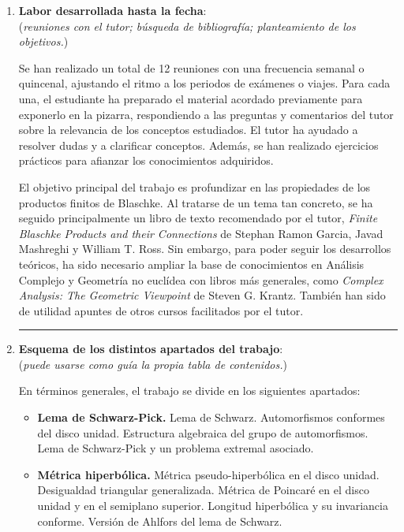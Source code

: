 \documentclass[a4paper,oneside,11pt,leqno]{article}
\begin{document}
\begin{enumerate}[label=\textbf{\arabic*.}]

\item {\bf Labor desarrollada hasta la fecha}: \\
{\small (\textit{reuniones con el tutor; b\'usqueda de bibliograf\'ia; planteamiento de los objetivos.})}

Se han realizado un total de 12 reuniones con una frecuencia semanal o quincenal, ajustando el ritmo a los periodos de ex\'amenes o viajes. Para cada una, el estudiante ha preparado el material acordado previamente para exponerlo en la pizarra, respondiendo a las preguntas y comentarios del tutor sobre la relevancia de los conceptos estudiados. El tutor ha ayudado a resolver dudas y a clarificar conceptos. Adem\'as, se han realizado ejercicios pr\'acticos para afianzar los conocimientos adquiridos.

El objetivo principal del trabajo es profundizar en las propiedades de los productos finitos de Blaschke. Al tratarse de un tema tan concreto, se ha seguido principalmente un libro de texto recomendado por el tutor, \cite{garciaFiniteBlaschkeProducts2018} \textit{Finite Blaschke Products and their Connections} de Stephan Ramon Garcia, Javad Mashreghi y William T. Ross. Sin embargo, para poder seguir los desarrollos te\'oricos, ha sido necesario ampliar la base de conocimientos en An\'alisis Complejo y Geometr\'ia no eucl\'idea con libros m\'as generales, como \cite{krantzComplexAnalysisGeometric2004} \textit{Complex Analysis: The Geometric Viewpoint} de Steven G. Krantz. Tambi\'en han sido de utilidad \cite{Vukotic2020} apuntes de otros cursos facilitados por el tutor.

\vskip 20pt 
\hrule

\item {\bf Esquema de los distintos apartados del trabajo}: \\
{\small (\textit{puede usarse como gu\'ia la propia tabla de contenidos.})}

En t\'erminos generales, el trabajo se divide en los siguientes apartados:

\begin{itemize}
    \item \textbf{Lema de Schwarz-Pick.} Lema de Schwarz. Automorfismos conformes del disco unidad. Estructura algebraica del grupo de automorfismos. Lema de Schwarz-Pick y un problema extremal asociado.
    
    \item \textbf{M\'etrica hiperb\'olica.} M\'etrica pseudo-hiperb\'olica en el disco unidad. Desigualdad triangular generalizada. M\'etrica de Poincar\'e en el disco unidad y en el semiplano superior. Longitud hiperb\'olica y su invariancia conforme. Versi\'on de Ahlfors del lema de Schwarz.
    

\end{itemize}
\end{enumerate}
\end{document}
